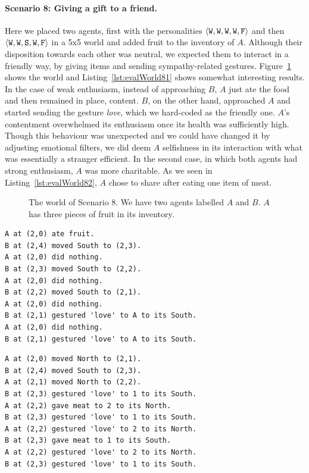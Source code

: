\paragraph{Scenario 8: Giving a gift to a friend.} Here we placed two agents, first with the personalities $\langle \mathtt{W},\mathtt{W}, \mathtt{W}, \mathtt{W}, \mathtt{F} \rangle$ and then $\langle \mathtt{W},\mathtt{W}, \mathtt{S}, \mathtt{W}, \mathtt{F} \rangle$ in a 5x5 world and added fruit to the inventory of $A$. Although their disposition towards each other was neutral, we expected them to interact in a friendly way, by giving items and sending sympathy-related gestures. Figure~\ref{fig:evalWorld8} shows the world and Listing~\ref{lst:evalWorld81} shows somewhat interesting results. In the case of weak enthusiasm, instead of approaching $B$, $A$ just ate the food and then remained in place, content. $B$, on the other hand, approached $A$ and started sending the gesture \emph{love}, which we hard-coded as the friendly one. $A$'s contentment overwhelmed its enthusiasm once its health was sufficiently high. Though this behaviour was unexpected and we could have changed it by adjusting emotional filters, we did deem $A$ selfishness in its interaction with what was essentially a stranger efficient. In the second case, in which both agents had strong enthusiasm, $A$ was more charitable. As we seen in Listing~\ref{lst:evalWorld82}, $A$ chose to share after eating one item of meat.

\begin{figure}[t]
    \centering
    
    \caption{The world of Scenario 8. We have two agents labelled $A$ and $B$. $A$ has three pieces of fruit in its inventory.}
    \label{fig:evalWorld8}
\end{figure}

\begin{lstlisting}[caption=Actions in Scenario 8 when both agents had the personality $\personality{W}{W}{W}{W}{F}$., label=lst:evalWorld81, float=t]
A at (2,0) ate fruit.
B at (2,4) moved South to (2,3).
A at (2,0) did nothing.
B at (2,3) moved South to (2,2).
A at (2,0) did nothing.
B at (2,2) moved South to (2,1).
A at (2,0) did nothing.
B at (2,1) gestured 'love' to A to its South.
A at (2,0) did nothing.
B at (2,1) gestured 'love' to A to its South.
\end{lstlisting}

\begin{lstlisting}[caption=Actions in Scenario 8 when both agents had the personality $\personality{W}{W}{S}{W}{F}$., label=lst:evalWorld82, float=t]
A at (2,0) moved North to (2,1).
B at (2,4) moved South to (2,3).
A at (2,1) moved North to (2,2).
B at (2,3) gestured 'love' to 1 to its South.
A at (2,2) gave meat to 2 to its North.
B at (2,3) gestured 'love' to 1 to its South.
A at (2,2) gestured 'love' to 2 to its North.
B at (2,3) gave meat to 1 to its South.
A at (2,2) gestured 'love' to 2 to its North.
B at (2,3) gestured 'love' to 1 to its South.
\end{lstlisting}

